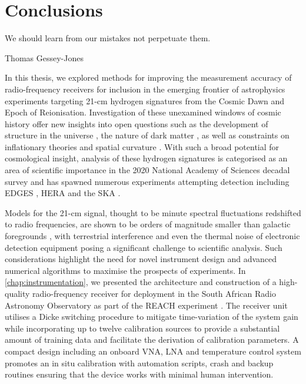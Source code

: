 \chapter{Conclusions}\label{chap:conclusions}

\ifpdf
    \graphicspath{{conclusions/figs/Raster/}{conclusions/figs/PDF/}{conclusions/figs/}}
\else
    \graphicspath{{conclusions/figs/Vector/}{conclusions/figs/}}
\fi

\epigraph{We should learn from our mistakes not perpetuate them.}{Thomas Gessey-Jones}

In this thesis, we explored methods for improving the measurement accuracy of radio-frequency receivers for inclusion in the emerging frontier of astrophysics experiments targeting 21-cm hydrogen signatures from the Cosmic Dawn and Epoch of Reionisation. Investigation of these unexamined windows of cosmic history offer new insights into open questions such as the development of structure in the universe \citep{furlanetto_ast}, the nature of dark matter \citep{21cm_dm}, as well as constraints on inflationary theories and spatial curvature \citep{21cm_inflation,21cm_curvature}. With such a broad potential for cosmological insight, analysis of these hydrogen signatures is categorised as an area of scientific importance in the 2020 National Academy of Sciences decadal survey \citep{decade_survey} and has spawned numerous experiments attempting detection including EDGES \citep{edges}, HERA \citep{hera} and the SKA \citep{ska}.

Models for the 21-cm signal, thought to be minute spectral fluctuations redshifted to radio frequencies, are shown to be orders of magnitude smaller than galactic foregrounds \citep{foregrounds}, with terrestrial interference \citep{reach} and even the thermal noise of electronic detection equipment posing a significant challenge to scientific analysis. Such considerations highlight the need for novel instrument design and advanced numerical algorithms to maximise the prospects of experiments. In \cref{chap:instrumentation}, we presented the architecture and construction of a high-quality radio-frequency receiver for deployment in the South African Radio Astronomy Observatory as part of the REACH experiment \citep{reach}. The receiver unit utilises a Dicke switching procedure to mitigate time-variation of the system gain while incorporating up to twelve calibration sources to provide a substantial amount of training data and facilitate the derivation of calibration parameters. A compact design including an onboard VNA, LNA and temperature control system promotes an in situ calibration with automation scripts, crash and backup routines ensuring that the device works with minimal human intervention.

